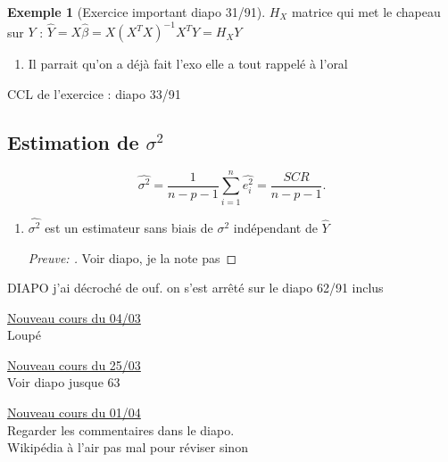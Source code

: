\documentclass{article}
\theoremstyle{plain}%
\theoremstyle{definition}
\newtheorem{exmp}{Exemple}[section]
\theoremstyle{remark}
\begin{document}
\begin{exmp}[Exercice important diapo 31/91]
    $ H_X $ matrice qui met le chapeau sur $ Y $ : $ \hat{Y} = X \hat{\beta } = X (X^TX)^{-1} X^T Y = H_X Y $ 
    \begin{enumerate}
        \item Il parrait qu'on a déjà fait l'exo elle a tout rappelé à l'oral 
    \end{enumerate}
    CCL de l'exercice : diapo 33/91
\end{exmp}

\subsection{Estimation de $\sigma ^2$}

\[
    \hat{\sigma ^2} = \frac{1}{n-p-1}\sum_{i=1}^{n} \hat{e_i^2} = \frac{SCR}{n-p-1}
.\]
\begin{enumerate}
    \item $ \hat{\sigma ^2} $ est un estimateur sans biais de $ \sigma ^2 $ indépendant de $ \hat{Y} $ 
    \begin{proof}[Preuve: ]
        Voir diapo, je la note pas 
    \end{proof}
    
    
\end{enumerate}
DIAPO j'ai décroché de ouf. on s'est arrêté sur le diapo 62/91 inclus

\underline{Nouveau cours du 04/03} \\
Loupé

\underline{Nouveau cours du 25/03} \\
Voir diapo jusque 63

\underline{Nouveau cours du 01/04} \\
Regarder les commentaires dans le diapo.
\\Wikipédia à l'air pas mal pour réviser sinon
\end{document}
